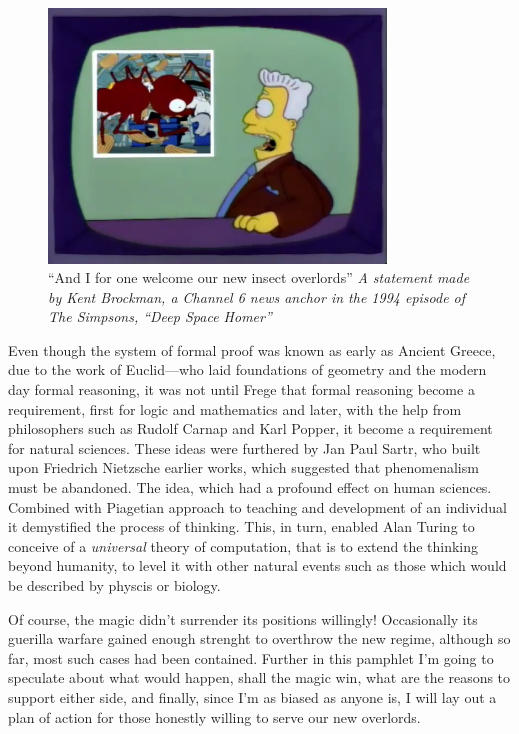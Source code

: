 \documentclass[11pt]{article}
\begin{document}
\begin{figure}[h!]
  \centering
  \includegraphics[width=0.8\textwidth]{./insect-overlords.png}
  \caption[Welcome insect overlords]{
    \ssmall ``And I for one welcome our new insect overlords''
    \textit{A statement made by Kent Brockman, a Channel 6 news anchor in
      the 1994 episode of The Simpsons, ``Deep Space Homer''}}
\end{figure}

Even though the system of formal proof was known as early as Ancient Greece,
due to the work of Euclid---who laid foundations of geometry and the modern
day formal reasoning, it was not until Frege that formal reasoning become a
requirement, first for logic and mathematics and later, with the help from
philosophers such as Rudolf Carnap and Karl Popper, it become a requirement
for natural sciences.  These ideas were furthered by Jan Paul Sartr, who built
upon Friedrich Nietzsche earlier works, which suggested that phenomenalism
must be abandoned.  The idea, which had a profound effect on human sciences.
Combined with Piagetian approach to teaching and development of an individual
it demystified the process of thinking.  This, in turn, enabled Alan Turing to
conceive of a \emph{universal} theory of computation, that is to extend the
thinking beyond humanity, to level it with other natural events such as those
which would be described by physcis or biology.

Of course, the magic didn't surrender its positions willingly! Occasionally
its guerilla warfare gained enough strenght to overthrow the new regime,
although so far, most such cases had been contained.  Further in this
pamphlet I'm going to speculate about what would happen, shall the magic win,
what are the reasons to support either side, and finally, since I'm as biased
as anyone is, I will lay out a plan of action for those honestly willing to
serve our new overlords.
\end{document}
